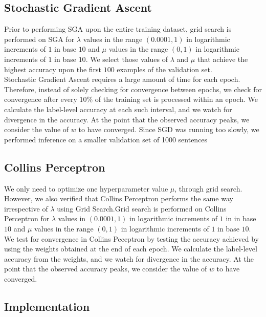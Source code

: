 \documentclass[11pt,a4paper,oneside]{article}
\begin{document}
\subsection{Stochastic Gradient Ascent}

Prior to performing SGA upon the entire training dataset, grid search is performed on SGA for $\lambda$ values in the range $(0.0001,1)$ in logarithmic increments of $1$ in base $10$ and $\mu$ values in the range $(0, 1)$ in logarithmic increments of $1$ in base $10$. We select those values of $\lambda$ and $\mu$ that achieve the highest accuracy upon the first $100$ examples of the validation set.\\

Stochastic Gradient Ascent requires a large amount of time for each epoch. Therefore, instead of solely checking for convergence between epochs, we check for convergence after every $10\%$ of the training set is processed within an epoch. We calculate the label-level accuracy at each such interval, and we watch for divergence in the accuracy. At the point that the observed accuracy peaks, we consider the value of $w$ to have converged. Since SGD was running too slowly, we performed inference on a smaller validation set of 1000 sentences

\subsection{Collins Perceptron}

We only need to optimize one hyperparameter value $\mu$, through grid search. However, we also verified that Collins Perceptron performs the same way irrespective of $\lambda$ using Grid Search.Grid search is performed on Collins Perceptron for $\lambda$ values in $(0.0001, 1)$ in logarithmic increments of $1$ in in base $10$ and $\mu$ values in the range $(0, 1)$ in logarithmic increments of $1$ in base $10$.
\\

We test for convergence in Collins Peceptron by testing the accuracy achieved by using the weights obtained at the end of each epoch. We calculate the label-level accuracy from the weights, and we watch for divergence in the accuracy. At the point that the observed accuracy peaks, we consider the value of $w$ to have converged.

\subsection{Implementation}
\end{document}
